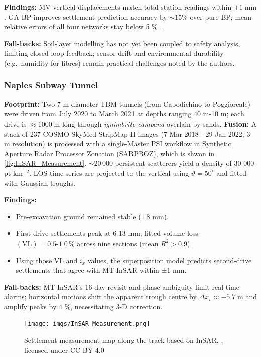 \documentclass[preprint,11pt,authoryear,3p]{elsarticle}
\begin{document}
\textbf{Findings:} MV vertical displacements match total-station readings within $\pm1\;\mathrm{mm}$. GA-BP improves settlement prediction accuracy by $\sim15\%$ over pure BP; mean relative errors of all four networks stay below 5 \% .

\textbf{Fall-backs:} Soil-layer modelling has not yet been coupled to safety analysis, limiting closed-loop feedback; sensor drift and environmental durability (e.g.\ humidity for fibres) remain practical challenges noted by the authors.

\subsubsection{Naples Subway Tunnel}
\label{subsec:naples_case}

\textbf{Footprint:} Two 7 m-diameter TBM tunnels (from Capodichino to Poggioreale) were driven from July 2020 to March 2021 at depths ranging 40 m-10 m; each drive is $\approx1000\;\mathrm{m}$ long through \emph{ignimbrite campana} overlain by sands. \textbf{Fusion:} A stack of 237 COSMO-SkyMed StripMap-H images (7 Mar 2018 - 29 Jan 2022, 3 m resolution) is processed with a single-Master PSI workflow in Synthetic Aperture Radar Processor Zonation (SARPROZ), which is shwon in \autoref{fig:InSAR_Measurement}. $\sim 20\,000$ persistent scatterers yield a density of 30 000 pt km\(^{-2}\). LOS time-series are projected to the vertical using $\vartheta\!=\!50^{\circ}$ and fitted with Gaussian troughs.

\textbf{Findings:}
\begin{itemize}
  \item Pre-excavation ground remained stable (±8 mm).
  \item First-drive settlements peak at 6-13 mm; fitted volume-loss $\mathrm{(VL)}=0.5\text{-}1.0\,\%$ across nine sections (mean $R^{2}>0.9$).
  \item Using those VL and $i_x$ values, the superposition model predicts second-drive settlements that agree with MT-InSAR within ±1 mm.
\end{itemize}

\textbf{Fall-backs:} MT-InSAR's 16-day revisit and phase ambiguity limit real-time alarms; horizontal motions shift the apparent trough centre by $\Delta x_v\approx-5.7\;\mathrm{m}$ and amplify peaks by 4 \%, necessitating 3-D correction.

\begin{figure}
  \centering
  \texttt{[image: imgs/InSAR\_Measurement.png]}
  \caption{Settlement measurement map along the track based on InSAR, \citep{rs15102555}, licensed under CC BY 4.0}
  \label{fig:InSAR_Measurement}
\end{figure}
\end{document}
